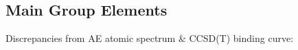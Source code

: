 \subsection{Main Group Elements}
\begin{frame}

  \large

  {\color{NavyBlue}Discrepancies from AE atomic spectrum \& CCSD(T) binding curve: }%


\end{frame}
